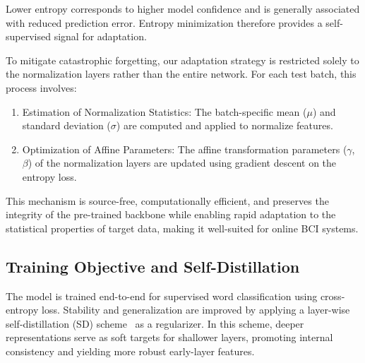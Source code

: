 \documentclass{article}
\begin{document}
Lower entropy corresponds to higher model confidence and is generally associated with reduced prediction error. Entropy minimization therefore provides a self-supervised signal for adaptation.

To mitigate catastrophic forgetting, our adaptation strategy is restricted solely to the normalization layers rather than the entire network. For each test batch, this process involves:
\begin{enumerate}
    \item Estimation of Normalization Statistics: The batch-specific mean ($\mu$) and standard deviation ($\sigma$) are computed and applied to normalize features.
    \item Optimization of Affine Parameters: The affine transformation parameters ($\gamma$, $\beta$) of the normalization layers are updated using gradient descent on the entropy loss.
\end{enumerate}
This mechanism is source-free, computationally efficient, and preserves the integrity of the pre-trained backbone while enabling rapid adaptation to the statistical properties of target data, making it well-suited for online BCI systems.



\subsection{Training Objective and Self\mbox{-}Distillation}

The model is trained end-to-end for supervised word classification using cross-entropy loss. Stability and generalization are improved by applying a layer-wise self-distillation (SD) scheme~\cite{zhang2021self} as a regularizer. In this scheme, deeper representations serve as soft targets for shallower layers, promoting internal consistency and yielding more robust early-layer features.

\end{document}
